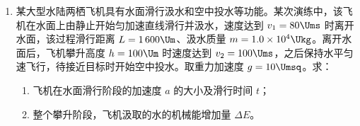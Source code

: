 \documentclass[\gkver]{gaokaozhenti}
\begin{document}
\begin{enumerate}
\item
某大型水陆两栖飞机具有水面滑行汲水和空中投水等功能。某次演练中，该飞机在水面上由静止开始匀加速直线滑行并汲水，速度达到 $v_{1}=80\Ums$ 时离开水面，该过程滑行距离 $L=1\,600\Um$、汲水质量 $m=1.0\times10^{4}\Ukg$。离开水面后，飞机攀升高度 $h=100\Um$ 时速度达到 $v_{2}=100\Ums$，之后保持水平匀速飞行，待接近目标时开始空中投水。取重力加速度 $g=10\Umsq$。求：
\begin{enumerate}
	\item
	飞机在水面滑行阶段的加速度 $a$ 的大小及滑行时间 $t$；
	\item
	整个攀升阶段，飞机汲取的水的机械能增加量 $\Delta E$。
\end{enumerate}


\end{enumerate}
\end{document}
